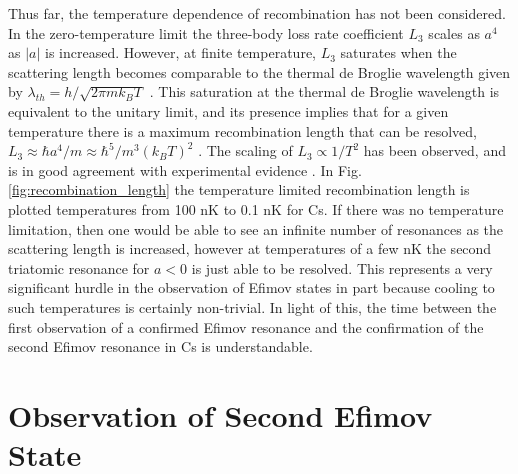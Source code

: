 \documentclass[prl,onecolumn,amsmath,amssymb,titlepage,nofootinbib,preprint]{revtex4-1}
\begin{document}
Thus far, the temperature dependence of recombination has not been considered.  In the zero-temperature limit the three-body loss rate coefficient $L_{3}$ scales as $a^{4}$ as $|a|$ is increased.  However, at finite temperature, $L_{3}$ saturates when the scattering length becomes comparable to the thermal de Broglie wavelength given by $\lambda_{th}=h/\sqrt{2\pi m k_{B}T}$ \cite{Rem2013} \cite{Li2012}.  This saturation at the thermal de Broglie wavelength is equivalent to the unitary limit, and its presence implies that for a given temperature there is a maximum recombination length that can be resolved, $L_{3}\approx\hbar a^{4}/m\approx\hbar^{5}/m^{3}(k_{B}T)^{2}$ \cite{DIncao2004}.  The scaling of $L_{3}\propto 1/T^{2}$ has been observed, and is in good agreement with experimental evidence \cite{Rem2013}.  In Fig. \ref{fig:recombination_length} the temperature limited recombination length is plotted temperatures from 100 nK to 0.1 nK for Cs.  If there was no temperature limitation, then one would be able to see an infinite number of resonances as the scattering length is increased, however at temperatures of a few nK the second triatomic resonance for $a<0$ is just able to be resolved.  This represents a very significant hurdle in the observation of Efimov states \cite{D'Incao2009} in part because cooling to such temperatures is certainly non-trivial. In light of this, the time between the first observation of a confirmed Efimov resonance \cite{Kraemer2006_1st_observ} and the confirmation of the second Efimov resonance in Cs \cite{Huang2014} is understandable.



\section{Observation of Second Efimov State}
\end{document}
